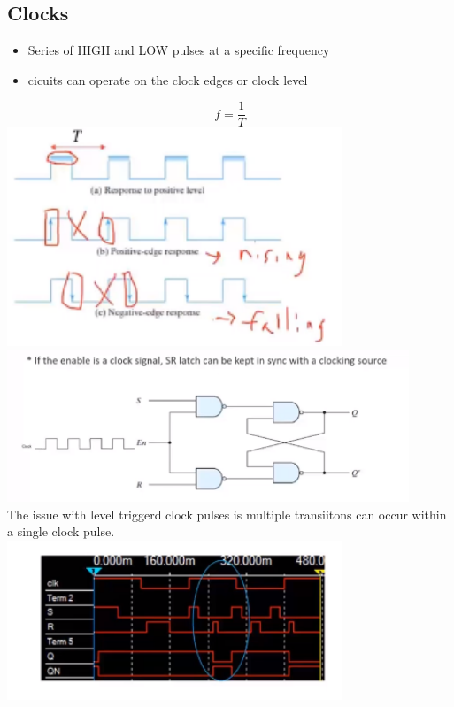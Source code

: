 \documentclass[a4paper,12pt]{article}
\begin{document}
    \subsection{Clocks}
        \begin{itemize}
            \item Series of HIGH and LOW pulses at a specific frequency
            \item cicuits can operate on the clock edges or clock level
        \end{itemize}
        \[f=\frac{1}{T}\]
            \includegraphics[width=10cm]{clocks_EdgeandLevel.png}\\
        \includegraphics[width=12cm]{SRClock.png}\\
        The issue with level triggerd clock pulses is multiple transiitons can occur within a single clock pulse. \\
        \includegraphics[width=10cm]{SRtimingDiagram.png}
\end{document}
